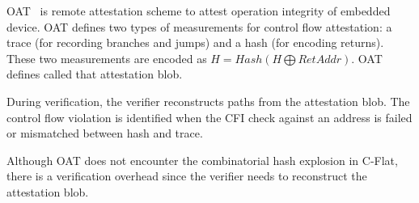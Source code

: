 OAT~\cite{sunOATAttestingOperation2020} is remote attestation scheme to attest
operation integrity of embedded device. OAT defines two types of measurements
for control flow attestation: a trace (for recording branches and jumps) and a
hash (for encoding returns). These two measurements are encoded as $H = Hash(H
\bigoplus RetAddr)$. OAT defines called that attestation blob.

During verification, the verifier reconstructs paths from the attestation blob.
The control flow violation is identified when the CFI check against an address is
failed or mismatched between hash and trace.

Although OAT does not encounter the combinatorial hash explosion in C-Flat,
there is a verification overhead since the verifier needs to reconstruct the
attestation blob. 
